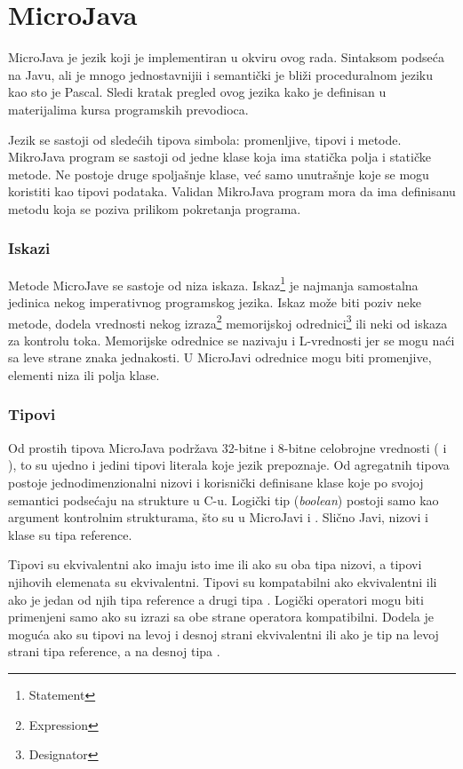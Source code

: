 
\chapter{MicroJava}

MicroJava je jezik koji je implementiran u okviru ovog rada. 
Sintaksom podseća na Javu, ali je mnogo jednostavnijii i semantički je bliži proceduralnom jeziku kao sto je Pascal. 
Sledi kratak pregled ovog jezika kako je definisan u materijalima kursa programskih prevodioca.

Jezik se sastoji od sledećih tipova simbola: promenljive, tipovi i metode. 
MikroJava program se sastoji od jedne klase koja ima statička polja i statičke metode. 
Ne postoje druge spoljašnje klase, već samo unutrašnje koje se mogu koristiti kao tipovi podataka. 
Validan  MikroJava program mora da ima definisanu metodu  koja se poziva prilikom pokretanja programa.

\subsection*{Iskazi}

Metode MicroJave se sastoje od niza iskaza. 
Iskaz\footnote{\eng Statement} 
	je najmanja samostalna jedinica nekog imperativnog programskog jezika. 
Iskaz može biti poziv neke metode, dodela vrednosti nekog izraza\footnote{\eng Expression} 
	memorijskoj odrednici\footnote{\eng Designator} 
	ili neki od iskaza za kontrolu toka. 
Memorijske odrednice se nazivaju i L-vrednosti jer se mogu naći sa leve strane znaka jednakosti. 
U MicroJavi odrednice mogu biti promenjive, elementi niza ili polja klase.

\subsection*{Tipovi}

Od prostih tipova MicroJava podržava 32-bitne i 8-bitne celobrojne vrednosti ( i ), 
	to su ujedno i jedini tipovi literala koje jezik prepoznaje. 
Od agregatnih tipova postoje jednodimenzionalni nizovi i korisnički definisane klase koje po svojoj semantici podsećaju na strukture u C-u. 
Logički tip (\textit{boolean}) postoji samo kao argument kontrolnim strukturama, što su u MicroJavi  i . 
Slično Javi, nizovi i klase su tipa reference.

Tipovi su ekvivalentni ako imaju isto ime ili ako su oba tipa nizovi, a tipovi njihovih elemenata su ekvivalentni. 
Tipovi su kompatabilni ako ekvivalentni ili ako je jedan od njih tipa reference a drugi tipa . 
Logički operatori mogu biti primenjeni samo ako su izrazi sa obe strane operatora kompatibilni. 
Dodela je moguća ako su tipovi na levoj i desnoj strani ekvivalentni ili ako je tip na levoj strani tipa reference, a na desnoj tipa .

